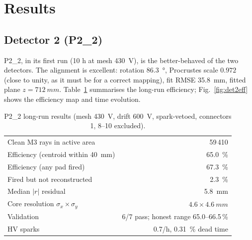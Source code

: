 \documentclass[11pt,a4paper]{article}
\newcommand{\dettwo}{P2\_2}
\begin{document}
\section{Results}
\label{sec:results}

\subsection{Detector 2 (\dettwo{})}
\label{sec:results-det2}

\dettwo{}, in its first run (10 h at mesh \SI{430}{V}), is the better-behaved
of the two detectors. The alignment is excellent: rotation
\SI{86.3}{\degree}, Procrustes scale $0.972$ (close to unity, as it must be
for a correct mapping), fit RMSE \SI{35.8}{mm}, fitted plane
$z=\SI{712}{mm}$. Table~\ref{tab:det2} summarises the long-run efficiency;
Fig.~\ref{fig:det2eff} shows the efficiency map and time evolution.

\begin{table}[htb]
  \centering
  \caption{\dettwo{} long-run results (mesh \SI{430}{V}, drift \SI{600}{V},
  spark-vetoed, connectors 1, 8--10 excluded).}
  \label{tab:det2}
  \small
  \begin{tabular}{lr}
    \toprule
    Clean M3 rays in active area & 59\,410 \\
    Efficiency (centroid within \SI{40}{mm}) & \SI{65.0}{\percent} \\
    Efficiency (any pad fired) & \SI{67.3}{\percent} \\
    Fired but not reconstructed & \SI{2.3}{\percent} \\
    Median $|r|$ residual & \SI{5.8}{mm} \\
    Core resolution $\sigma_x \times \sigma_y$ & $4.6 \times \SI{4.6}{mm}$ \\
    Validation & 6/7 pass; honest range 65.0--66.5\,\% \\
    HV sparks & 0.7/h, \SI{0.31}{\percent} dead time \\
    \bottomrule
  \end{tabular}
\end{table}
\end{document}
